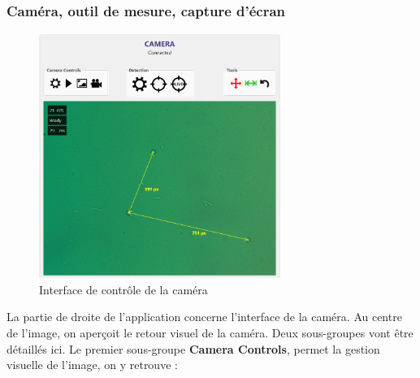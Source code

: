 \subsubsection{Caméra, outil de mesure, capture d'écran}

\begin{figure}[H]
    \centering
    \includegraphics[width=0.7\textwidth]{assets/figures/Application_ServoVision/Measure_Tool.png}
    \caption{Interface de contrôle de la caméra}
    \label{Measure_Tool}
\end{figure}
La partie de droite de l'application concerne l'interface de la caméra. Au centre de l'image, on aperçoit le retour visuel de la caméra. Deux sous-groupes vont être détaillés ici.
\newpage
Le premier sous-groupe \textbf{Camera Controls}, permet la gestion visuelle de l'image, on y retrouve :
